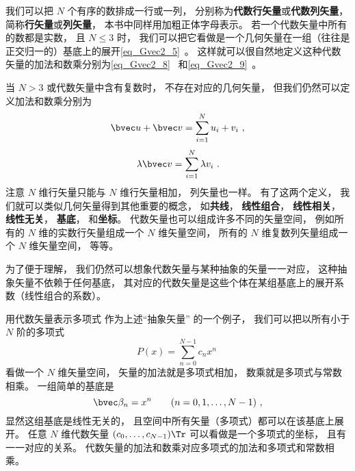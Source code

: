 

我们可以把 $N$ 个有序的数排成一行或一列， 分别称为\textbf{代数行矢量}或\textbf{代数列矢量}， 简称\textbf{行矢量}或\textbf{列矢量}， 本书中同样用加粗正体字母表示。 若一个代数矢量中所有的数都是实数， 且 $N \leqslant 3$%
时， 我们可以把它看做是一个几何矢量在一组（往往是正交归一的）基底上的展开\autoref{eq_Gvec2_5}~。 这样就可以很自然地定义这种代数矢量的加法和数乘分别为\autoref{eq_Gvec2_8}~ 和\autoref{eq_Gvec2_9}~。

当 $N > 3$ 或代数矢量中含有复数时， 不存在对应的几何矢量， 但我们仍然可以定义加法和数乘分别为
\begin{equation}
\bvec u + \bvec v = \sum_{i = 1}^N u_i + v_i~,
\end{equation}
\begin{equation}
\lambda \bvec v = \sum_{i = 1}^N \lambda v_i~.
\end{equation}
注意 $N$ 维行矢量只能与 $N$ 维行矢量相加， 列矢量也一样。 有了这两个定义， 我们就可以类似几何矢量得到其他重要的概念， 如\textbf{共线}， \textbf{线性组合}， \textbf{线性相关}， \textbf{线性无关}， \textbf{基底}， 和\textbf{坐标}。 代数矢量也可以组成许多不同的矢量空间， 例如所有的 $N$ 维的实数行矢量组成一个 $N$ 维矢量空间， 所有的 $N$ 维复数列矢量组成一个 $N$ 维矢量空间， 等等。

为了便于理解， 我们仍然可以想象代数矢量与某种抽象的矢量一一对应， 这种抽象矢量不依赖于任何基底， 其对应的代数矢量是这些个体在某组基底上的展开系数（线性组合的系数）。

\begin{example}{用代数矢量表示多项式}
作为上述“抽象矢量” 的一个例子， 我们可以把以所有小于 $N$ 阶的多项式
\begin{equation}
P(x) = \sum_{n = 0}^{N-1} c_n x^n~
\end{equation}
看做一个 $N$ 维矢量空间， 矢量的加法就是多项式相加， 数乘就是多项式与常数相乘。 一组简单的基底是
\begin{equation}
\bvec \beta_n = x^n \qquad (n = 0, 1, \dots, N-1)~,
\end{equation}
显然这组基底是线性无关的， 且空间中所有矢量（多项式）都可以在该基底上展开。 任意 $N$ 维代数矢量 $(c_0, \dots, c_{N-1})\Tr$ 可以看做是一个多项式的坐标， 且有一一对应的关系。 代数矢量的加法和数乘对应多项式的加法和多项式和常数相乘。
\end{example}

